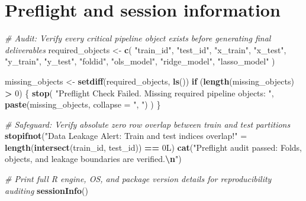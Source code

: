 \documentclass[
  11pt,
]{article}
\newenvironment{Shaded}{\begin{snugshade}}{\end{snugshade}}
\newcommand{\AttributeTok}[1]{\textcolor[rgb]{0.13,0.29,0.53}{#1}}
\newcommand{\CommentTok}[1]{\textcolor[rgb]{0.56,0.35,0.01}{\textit{#1}}}
\newcommand{\ControlFlowTok}[1]{\textcolor[rgb]{0.13,0.29,0.53}{\textbf{#1}}}
\newcommand{\DataTypeTok}[1]{\textcolor[rgb]{0.13,0.29,0.53}{#1}}
\newcommand{\DecValTok}[1]{\textcolor[rgb]{0.00,0.00,0.81}{#1}}
\newcommand{\FunctionTok}[1]{\textcolor[rgb]{0.13,0.29,0.53}{\textbf{#1}}}
\newcommand{\NormalTok}[1]{#1}
\newcommand{\OtherTok}[1]{\textcolor[rgb]{0.56,0.35,0.01}{#1}}
\newcommand{\SpecialCharTok}[1]{\textcolor[rgb]{0.81,0.36,0.00}{\textbf{#1}}}
\newcommand{\StringTok}[1]{\textcolor[rgb]{0.31,0.60,0.02}{#1}}
\begin{document}
\section*{Preflight and session
information}\label{preflight-and-session-information}

\begin{Shaded}
\begin{Highlighting}[]
\CommentTok{\# Audit: Verify every critical pipeline object exists before generating final deliverables}
\NormalTok{required\_objects }\OtherTok{\textless{}{-}} \FunctionTok{c}\NormalTok{(}
  \StringTok{"train\_id"}\NormalTok{, }\StringTok{"test\_id"}\NormalTok{, }\StringTok{"x\_train"}\NormalTok{, }\StringTok{"x\_test"}\NormalTok{, }\StringTok{"y\_train"}\NormalTok{, }\StringTok{"y\_test"}\NormalTok{, }
  \StringTok{"foldid"}\NormalTok{, }\StringTok{"ols\_model"}\NormalTok{, }\StringTok{"ridge\_model"}\NormalTok{, }\StringTok{"lasso\_model"}
\NormalTok{)}

\NormalTok{missing\_objects }\OtherTok{\textless{}{-}} \FunctionTok{setdiff}\NormalTok{(required\_objects, }\FunctionTok{ls}\NormalTok{())}
\ControlFlowTok{if}\NormalTok{ (}\FunctionTok{length}\NormalTok{(missing\_objects) }\SpecialCharTok{\textgreater{}} \DecValTok{0}\NormalTok{) \{}
  \FunctionTok{stop}\NormalTok{(}
    \StringTok{"Preflight Check Failed. Missing required pipeline objects: "}\NormalTok{,}
    \FunctionTok{paste}\NormalTok{(missing\_objects, }\AttributeTok{collapse =} \StringTok{", "}\NormalTok{)}
\NormalTok{  )}
\NormalTok{\}}

\CommentTok{\# Safeguard: Verify absolute zero row overlap between train and test partitions}
\FunctionTok{stopifnot}\NormalTok{(}\StringTok{"Data Leakage Alert: Train and test indices overlap!"} \OtherTok{=} \FunctionTok{length}\NormalTok{(}\FunctionTok{intersect}\NormalTok{(train\_id, test\_id)) }\SpecialCharTok{==} \DecValTok{0}\DataTypeTok{L}\NormalTok{)}
\FunctionTok{cat}\NormalTok{(}\StringTok{"Preflight audit passed: Folds, objects, and leakage boundaries are verified.}\SpecialCharTok{\textbackslash{}n}\StringTok{"}\NormalTok{)}
\end{Highlighting}
\end{Shaded}

\begin{Shaded}
\begin{Highlighting}[]
\CommentTok{\# Print full R engine, OS, and package version details for reproducibility auditing}
\FunctionTok{sessionInfo}\NormalTok{()}
\end{Highlighting}
\end{Shaded}
\end{document}
